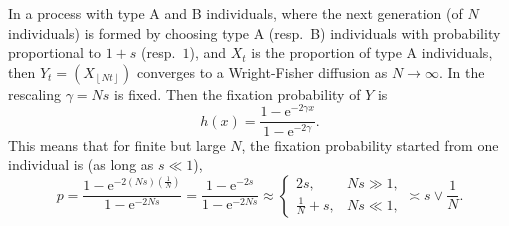 \documentclass{article}
\theoremstyle{nonumberplain}
\theoremstyle{nonumberplain}
\theoremstyle{empty}
\numberwithin{equation}{section}
\newcommand{\e}{\mathrm{e}}
\begin{document}
In a process with type A and B individuals, where the next generation (of $N$ individuals) is formed by choosing type A (resp.\ B) individuals with probability proportional to $1+s$ (resp.\ $1$), and $X_t$ is the proportion of type A individuals, then $Y_t = (X_{\left\lfloor Nt \right\rfloor })$ converges to a Wright-Fisher diffusion as $N\to \infty$. In the rescaling $\gamma = N s$ is fixed. Then the fixation probability of $Y$ is \[
    h(x) = \frac{1-\e^{-2\gamma x}}{1-\e^{-2\gamma}}.
\] This means that for finite but large $N$, the fixation probability started from one individual is (as long as $s\ll 1$),
\begin{equation*}
    p = \frac{1 - \e^{-2(Ns)(\frac{1}{N})}}{1-\e^{-2Ns}} = \frac{1- \e^{-2s}}{1-\e^{-2Ns}} \approx \begin{cases}
        2s, & Ns \gg 1,\\
        \frac{1}{N} + s, & Ns \ll 1,
    \end{cases}
    \asymp s \vee \frac{1}{N}.
\end{equation*}
\end{document}
